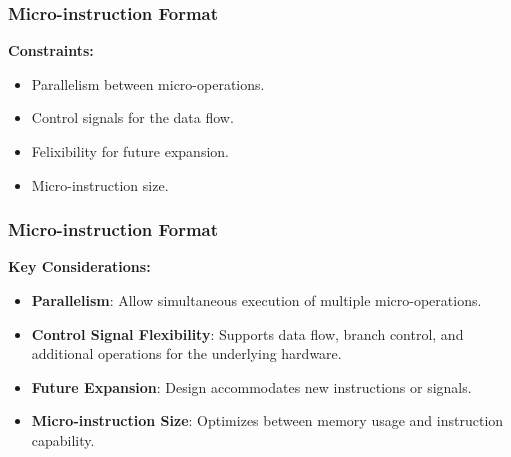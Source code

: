 \begin{frame}
    \frametitle{Micro-instruction Format}
    \textbf{Constraints:}
    \begin{itemize}
        \item Parallelism between micro-operations.
        \item Control signals for the data flow.
        \item Felixibility for future expansion.
        \item Micro-instruction size.
    \end{itemize}
\end{frame}

\begin{frame}
    \frametitle{Micro-instruction Format}
    \textbf{Key Considerations:}
    \begin{itemize}
        \item \textbf{Parallelism}: Allow simultaneous execution of multiple micro-operations.
        \item \textbf{Control Signal Flexibility}: Supports data flow, branch control, and additional operations for the underlying hardware.
        \item \textbf{Future Expansion}: Design accommodates new instructions or signals.
        \item \textbf{Micro-instruction Size}: Optimizes between memory usage and instruction capability.
    \end{itemize}
\end{frame}

